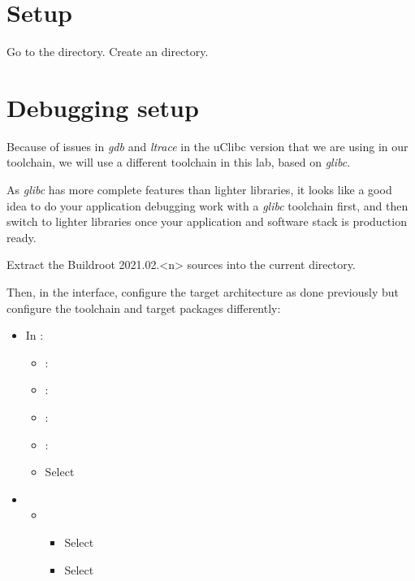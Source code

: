 
\section{Setup}

Go to the  directory.
Create an  directory.

\section{Debugging setup}

Because of issues in {\em gdb} and {\em ltrace} in the uClibc version
that we are using in our toolchain, we will use a different toolchain
in this lab, based on {\em glibc}.

As {\em glibc} has more complete features than lighter libraries,
it looks like a good idea to do your application debugging work
with a {\em glibc} toolchain first, and then switch to lighter libraries
once your application and software stack is production ready.

Extract the Buildroot 2021.02.<n> sources into the current directory.

Then, in the  interface, configure the target
architecture as done previously but configure the toolchain and
target packages differently:

\begin{itemize}
\item In :
   \begin{itemize}
   \item {}: 
   \item {}: 
   \item {}: 
   \item {}: 
   \item Select 
   \end{itemize}
 \item {}
   \begin{itemize}
   \item {}
     \begin{itemize}
     \item Select 
     \item Select 
     \end{itemize}
   \end{itemize}
\end{itemize}

